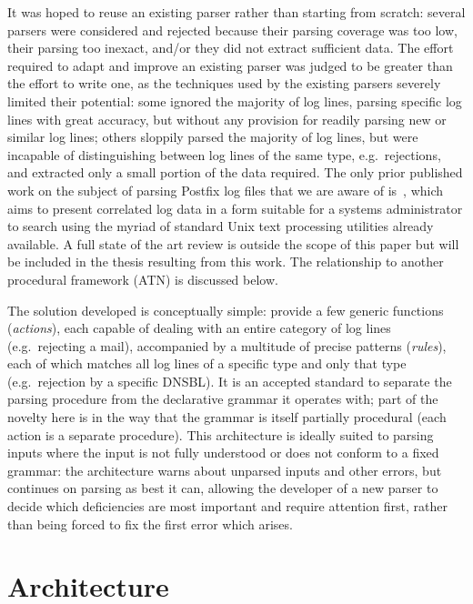 \documentclass[draft]{svmult}
\begin{document}
It was hoped to reuse an existing parser rather than starting from scratch:
several parsers were considered and rejected because their parsing coverage
was too low, their parsing too inexact, and/or they did not extract
sufficient data.  The effort required to adapt and improve an existing
parser was judged to be greater than the effort to write one, as the
techniques used by the existing parsers severely limited their potential:
some ignored the majority of log lines, parsing specific log lines with
great accuracy, but without any provision for readily parsing new or
similar log lines; others sloppily parsed the majority of log lines, but
were incapable of distinguishing between log lines of the same type, e.g.\
rejections, and extracted only a small portion of the data required.  The
only prior published work on the subject of parsing Postfix log files that
we are aware of is~\cite{log-mail-analyser}, which aims to present
correlated log data in a form suitable for a systems administrator to
search using the myriad of standard Unix text processing utilities already
available.  A full state of the art review is outside the scope of this
paper but will be included in the thesis resulting from this work.
The relationship to another procedural framework (ATN) is discussed below.

The solution developed is conceptually simple: provide a few generic
functions (\textit{actions\/}), each capable of dealing with an entire
category of log lines (e.g.\ rejecting a mail), accompanied by a multitude
of precise patterns (\textit{rules\/}), each of which matches all log lines
of a specific type and only that type (e.g.\ rejection by a specific
DNSBL).  It is an accepted standard to separate the parsing procedure from
the declarative grammar it operates with; part of the novelty here is in
the way that the grammar is itself partially procedural (each action is a
separate procedure).  This architecture is ideally suited to parsing inputs
where the input is not fully understood or does not conform to a fixed
grammar: the architecture warns about unparsed inputs and other errors, but
continues on parsing as best it can, allowing the developer of a new parser
to decide which deficiencies are most important and require attention
first, rather than being forced to fix the first error which arises.

\section{Architecture}
\end{document}
